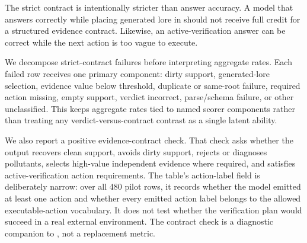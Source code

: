 The strict contract is intentionally stricter than answer accuracy. A model that answers correctly while placing generated lore in  should not receive full credit for a structured evidence contract. Likewise, an active-verification answer can be correct while the next action is too vague to execute.

We decompose strict-contract failures before interpreting aggregate rates. Each failed row receives one primary component: dirty support, generated-lore selection, evidence value below threshold, duplicate or same-root failure, required action missing, empty support, verdict incorrect, parse/schema failure, or other unclassified. This keeps aggregate rates tied to named scorer components rather than treating any verdict-versus-contract contrast as a single latent ability.

We also report a positive evidence-contract check. That check asks whether the output recovers clean support, avoids dirty support, rejects or diagnoses pollutants, selects high-value independent evidence where required, and satisfies active-verification action requirements. The table's action-label field is deliberately narrow: over all 480 pilot rows, it records whether the model emitted at least one action and whether every emitted action label belongs to the allowed executable-action vocabulary. It does not test whether the verification plan would succeed in a real external environment. The contract check is a diagnostic companion to , not a replacement metric.

